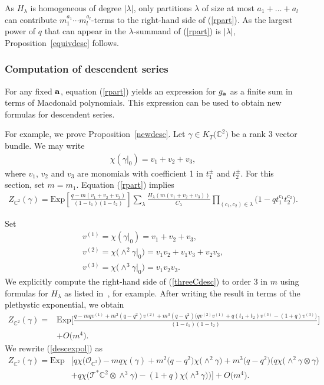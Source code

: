 \documentclass[pdftex]{sigma}
\numberwithin{equation}{section}
\newcommand{\Exp}{\mathrm{Exp}}
\def\C{\mathbb C}
\begin{document}
As $H_{\lambda}$ is homogeneous of degree $|\lambda|$, only partitions $\lambda$ of size at most $a_1+\dots+a_l$ can contribute $m_1^{a_1}\cdots m_l^{a_l}$-terms to the right-hand side of (\ref{rpart}). As the largest power of $q$ that can appear in the $\lambda$-summand of (\ref{rpart}) is $|\lambda|$, Proposition~\ref{equivdesc} follows.


\subsubsection{Computation of descendent series}\label{compdesc}

For any fixed ${\bf{a}}$, equation (\ref{rpart}) yields an expression for $g_{\bf{a}}$ as a finite sum in terms of Macdonald polynomials. This expression can be used to obtain new formulas for descendent series.

For example, we prove Proposition~\ref{newdesc}. Let $\gamma\in K_T\big(\C^2\big)$ be a rank $3$ vector bundle. We may write
\begin{gather*}
\chi(\gamma|_{0})= v_1+v_2+v_3,
\end{gather*}
where $v_1$, $v_2$ and $v_3$ are monomials with coefficient 1 in $t_1^{\pm}$ and $t_2^{\pm}$. For this section, set $m=m_1$. Equation (\ref{rpart}) implies
\begin{align}\label{threeCdesc} Z_{\C^2}(\gamma)=\Exp\left[\frac{q-m(v_1+v_2+v_3)}{(1-t_1)(1-t_2)}\right] \sum_{\lambda}\frac{H_{\lambda}(m(v_1+v_2+v_3))}{C_{\lambda}}\prod_{(c_1,c_2)\in \lambda}\big(1-qt_1^{c_1}t_2^{c_2}\big).\!\!\!
\end{align}

Set
\begin{gather*}
v^{(1)} = \chi(\gamma|_0)=v_1 + v_2 + v_3, \\
v^{(2)}=\chi\big({\wedge}^2 \gamma|_0\big)=v_1v_2+v_1v_3 + v_2v_3,\\
v^{(3)} =\chi\big({\wedge}^3 \gamma|_0\big)=v_1v_2v_3.
\end{gather*}
We explicitly compute the right-hand side of (\ref{threeCdesc}) to order $3$ in $m$ using formulas for $H_{\lambda}$ as listed in~\cite[Section~7.12]{OS}, for example. After writing the result in terms of the plethystic exponential, we obtain
\begin{align}
Z_{\C^2}(\gamma)\!=\!{}&\Exp\bigg[\frac{q\!-\!mqv^{(1)}\!\!+\!m^2(q\!-\!q^2)v^{(2)}\! +\!m^3(q\!-\!q^2)\big(qv^{(2)}v^{(1)}\! \!+\!q(t_1\!+\!t_2)v^{(3)}\!\!-\!(1\!+\!q)v^{(3)}\big) }{(1\!-\!t_1)(1\!-\!t_2)} \bigg] \nonumber
\\ \qquad
&+O\big(m^4\big).\label{descexpol}
\end{align}
We rewrite (\ref{descexpol}) as
\begin{align}
Z_{\C^2}(\gamma)=\Exp&\big[ q\chi\big(\mathcal{O}_{\C^2}\big)-mq\chi(\gamma)+m^2\big(q-q^2\big)\chi\big({\wedge}^2\gamma\big)
+m^3\big(q-q^2\big)\big(q\chi\big({\wedge}^2\gamma\otimes \gamma\big)\nonumber
\\
&+q\chi\big(\mathcal{T}^*\C^2\otimes\wedge^3\gamma\big)-(1+q)\chi \big({\wedge}^3\gamma\big)\big)\big]+ O\big(m^4\big).
\label{descexgeo}
\end{align}
\end{document}
